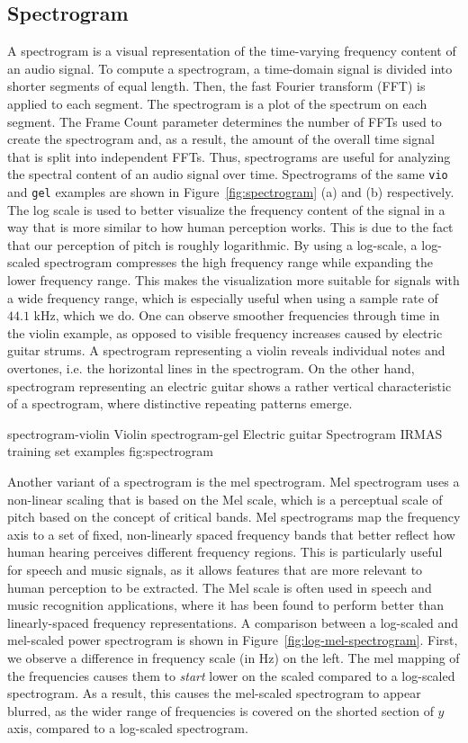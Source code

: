 \subsection{Spectrogram}
\label{sec:spectrogram}
A spectrogram is a visual representation of the time-varying frequency content of an audio signal. 
To compute a spectrogram, a time-domain signal is divided into shorter segments of equal length. Then, the fast Fourier transform (FFT) is applied to each segment. The spectrogram is a plot of the spectrum on each segment. The Frame Count parameter determines the number of FFTs used to create the spectrogram and, as a result, the amount of the overall time signal that is split into independent FFTs.
Thus, spectrograms are useful for analyzing the spectral content of an audio signal over time.
Spectrograms of the same \texttt{vio} and \texttt{gel} examples are shown in Figure~\ref{fig:spectrogram} (a) and (b) respectively. The log scale is used to better visualize the frequency content of the signal in a way that is more similar to how human perception works. This is due to the fact that our perception of pitch is roughly logarithmic. By using a log-scale, a log-scaled spectrogram compresses the high frequency range while expanding the lower frequency range. This makes the visualization more suitable for signals with a wide frequency range, which is especially useful when using a sample rate of $44.1$ kHz, which we do.
One can observe smoother frequencies through time in the violin example, as opposed to visible frequency increases caused by electric guitar strums. A spectrogram representing a violin reveals individual notes and overtones, i.e. the horizontal lines in the spectrogram. On the other hand, spectrogram representing an electric guitar shows a rather vertical characteristic of a spectrogram, where distinctive repeating patterns emerge.

\asideimages{15cm}{15cm}
	    {spectrogram-violin}
	    {Violin}
	    {spectrogram-gel}
	    {Electric guitar}
	    {Spectrogram IRMAS training set examples}
	    {fig:spectrogram}

Another variant of a spectrogram is the mel spectrogram. Mel spectrogram uses a non-linear scaling that is based on the Mel scale, which is a perceptual scale of pitch based on the concept of critical bands. Mel spectrograms map the frequency axis to a set of fixed, non-linearly spaced frequency bands that better reflect how human hearing perceives different frequency regions. This is particularly useful for speech and music signals, as it allows features that are more relevant to human perception to be extracted. The Mel scale is often used in speech and music recognition applications, where it has been found to perform better than linearly-spaced frequency representations. A comparison between a log-scaled and mel-scaled power spectrogram is shown in Figure~\ref{fig:log-mel-spectrogram}. First, we observe a difference in frequency scale (in Hz) on the left. The mel mapping of the frequencies causes them to \textit{start} lower on the scaled compared to a log-scaled spectrogram. As a result, this causes the mel-scaled spectrogram to appear blurred, as the wider range of frequencies is covered on the shorted section of $y$ axis, compared to a log-scaled spectrogram.

